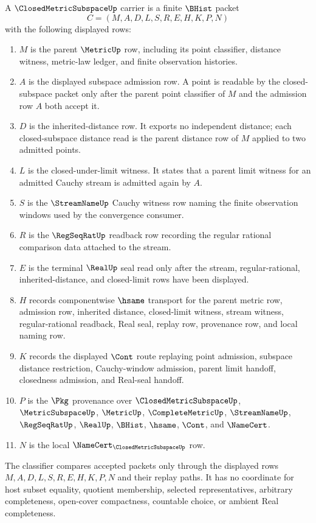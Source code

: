 \begin{definition}
\label{def:closed-metric-subspace-carrier}
A $\ClosedMetricSubspaceUp$ carrier is a finite $\BHist$ packet
$$
C=(M,A,D,L,S,R,E,H,K,P,N)
$$
with the following displayed rows:
\begin{enumerate}
\item $M$ is the parent $\MetricUp$ row, including its point classifier, distance witness, metric-law ledger, and finite observation histories.
\item $A$ is the displayed subspace admission row. A point is readable by the closed-subspace packet only after the parent point classifier of $M$ and the admission row $A$ both accept it.
\item $D$ is the inherited-distance row. It exports no independent distance; each closed-subspace distance read is the parent distance row of $M$ applied to two admitted points.
\item $L$ is the closed-under-limit witness. It states that a parent limit witness for an admitted Cauchy stream is admitted again by $A$.
\item $S$ is the $\StreamNameUp$ Cauchy witness row naming the finite observation windows used by the convergence consumer.
\item $R$ is the $\RegSeqRatUp$ readback row recording the regular rational comparison data attached to the stream.
\item $E$ is the terminal $\RealUp$ seal read only after the stream, regular-rational, inherited-distance, and closed-limit rows have been displayed.
\item $H$ records componentwise $\hsame$ transport for the parent metric row, admission row, inherited distance, closed-limit witness, stream witness, regular-rational readback, Real seal, replay row, provenance row, and local naming row.
\item $K$ records the displayed $\Cont$ route replaying point admission, subspace distance restriction, Cauchy-window admission, parent limit handoff, closedness admission, and Real-seal handoff.
\item $P$ is the $\Pkg$ provenance over $\ClosedMetricSubspaceUp$, $\MetricSubspaceUp$, $\MetricUp$, $\CompleteMetricUp$, $\StreamNameUp$, $\RegSeqRatUp$, $\RealUp$, $\BHist$, $\hsame$, $\Cont$, and $\NameCert$.
\item $N$ is the local $\NameCert_{\ClosedMetricSubspaceUp}$ row.
\end{enumerate}
The classifier compares accepted packets only through the displayed rows $M,A,D,L,S,R,E,H,K,P,N$ and their replay paths. It has no coordinate for host subset equality, quotient membership, selected representatives, arbitrary completeness, open-cover compactness, countable choice, or ambient Real completeness.
\end{definition}

